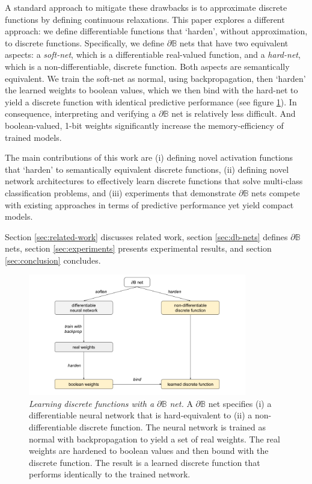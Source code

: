 \documentclass{article} %
\begin{document}
A standard approach to mitigate these drawbacks is to approximate discrete functions by defining continuous relaxations. This paper explores a different approach: we define differentiable functions that `harden', without approximation, to discrete functions. Specifically, we define $\partial \mathbb{B}$ nets that have two equivalent aspects: a {\em soft-net}, which is a differentiable real-valued function, and a {\em hard-net}, which is a non-differentiable, discrete function. Both aspects are semantically equivalent. We train the soft-net as normal, using backpropagation, then `harden' the learned weights to boolean values, which we then bind with the hard-net to yield a discrete function with identical predictive performance (see figure \ref{fig:main-idea}). In consequence, interpreting and verifying a $\partial \mathbb{B}$ net is relatively less difficult. And boolean-valued, 1-bit weights significantly increase the memory-efficiency of trained models.

The main contributions of this work are (i) defining novel activation functions that `harden' to semantically equivalent discrete functions, (ii) defining novel network architectures to effectively learn discrete functions that solve multi-class classification problems, and (iii) experiments that demonstrate $\partial \mathbb{B}$ nets compete with existing approaches in terms of predictive performance yet yield compact models.

Section \ref{sec:related-work} discusses related work, section \ref{sec:db-nets} defines $\partial\mathbb{B}$ nets, section \ref{sec:experiments} presents experimental results, and section \ref{sec:conclusion} concludes.

\begin{figure}[h]
	\centering
	\includegraphics[width=0.85\textwidth]{db-net.png}
	\caption{{\em Learning discrete functions with a $\partial\mathbb{B}$ net.} A $\partial \mathbb{B}$ net specifies (i) a differentiable neural network that is hard-equivalent to (ii) a non-differentiable discrete function. The neural network is trained as normal with backpropagation to yield a set of real weights. The real weights are hardened to boolean values and then bound with the discrete function. The result is a learned discrete function that performs identically to the trained network.}
	\label{fig:main-idea}
\end{figure}
\end{document}
